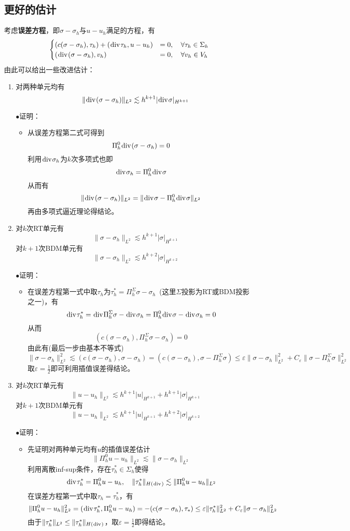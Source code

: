 \documentclass[a4paper,UTF8,fontset=windows]{ctexart}
\renewcommand*{\div}{\hspace{0.07em}\mathrm{div}\hspace{0.07em}}
\newcommand{\proo}[1]{{\kaishu $\bullet$证明：
\begin{itemize}
    \item[] #1
\end{itemize}
}}
\begin{document}
\subsection{更好的估计}
考虑\textbf{误差方程}，即$\sigma-\sigma_h$与$u-u_h$满足的方程，有
$$\begin{cases}(c(\sigma-\sigma_h),\tau_h)+(\div\tau_h,u-u_h)&=0,\quad\forall\tau_h\in\Sigma_h\\(\div(\sigma-\sigma_h),v_h)&=0,\quad\forall v_h\in V_h\end{cases}$$
由此可以给出一些改进估计：
\begin{enumerate}
    \item 对两种单元均有
    $$\|\div(\sigma-\sigma_h)\|_{L^2}\lesssim h^{k+1}|\div\sigma|_{H^{k+1}}$$
    
    \proo{
        从误差方程第二式可得到
        $$\Pi_h^0\div(\sigma-\sigma_h)=0$$
        利用$\div\sigma_h$为$k$次多项式也即
        $$\div\sigma_h=\Pi_h^0\div\sigma$$
        从而有
        $$\|\div(\sigma-\sigma_h)\|_{L^2}=\|\div\sigma-\Pi_h^0\div\sigma\|_{L^2}$$
        再由多项式逼近理论得结论。
    }
    
    \item
    对$k$次RT单元有
    $$\|\sigma-\sigma_h\|_{L^2}\lesssim h^{k+1}|\sigma|_{H^{k+1}}$$
    对$k+1$次BDM单元有
    $$\|\sigma-\sigma_h\|_{L^2}\lesssim h^{k+2}|\sigma|_{H^{k+2}}$$
    \proo{
        在误差方程第一式中取$\tau_h$为$\tau_h^*=\Pi_h^\Sigma\sigma-\sigma_h$\ (这里$\Sigma$投影为RT或BDM投影之一)，有
        $$\div\tau_h^*=\div\Pi_h^\Sigma\sigma-\div\sigma_h=\Pi_h^0\div\sigma-\div\sigma_h=0$$
        从而
        $$(c(\sigma-\sigma_h),\Pi_h^\Sigma\sigma-\sigma_h)=0$$
        由此有(最后一步由基本不等式)
        $$\|\sigma-\sigma_h\|_{L^2}^2\lesssim(c(\sigma-\sigma_h),\sigma-\sigma_h)=(c(\sigma-\sigma_h),\sigma-\Pi_h^\Sigma\sigma)\le\varepsilon\|\sigma-\sigma_h\|_{L^2}^2+C_\varepsilon\|\sigma-\Pi_h^\Sigma\sigma\|_{L^2}^2$$
        取$\varepsilon=\frac{1}{2}$即可利用插值误差得结论。
    }

    \item 
    对$k$次RT单元有
    $$\|u-u_h\|_{L^2}\lesssim h^{k+1}|u|_{H^{k+1}}+h^{k+1}|\sigma|_{H^{k+1}}$$
    对$k+1$次BDM单元有
    $$\|u-u_h\|_{L^2}\lesssim h^{k+1}|u|_{H^{k+1}}+h^{k+2}|\sigma|_{H^{k+2}}$$
    \proo{
        先证明对两种单元均有$u$的插值误差估计
        $$\|\Pi_h^0u-u_h\|_{L^2}\lesssim\|\sigma-\sigma_h\|_{L^2}$$
        利用离散inf-sup条件，存在$\tau_h^*\in\Sigma_h$使得
        $$\div\tau_h^*=\Pi_h^0u-u_h,\quad\|\tau_h^*\|_{H(\div)}\lesssim\|\Pi_h^0u-u_h\|_{L^2}$$
        在误差方程第一式中取$\tau_h=\tau_h^*$，有
        $$\|\Pi_h^0u-u_h\|_{L^2}^2=(\div\tau_h^*,\Pi_h^0u-u_h)=-(c(\sigma-\sigma_h),\tau_*)\le\varepsilon\|\tau_h^*\|_{L^2}^2+C_\varepsilon\|\sigma-\sigma_h\|_{L^2}^2$$
        由于$\|\tau_h^*\|_{L^2}\le\|\tau_h^*\|_{H(\div)}$，取$\varepsilon=\frac{1}{2}$即得结论。

}
\end{enumerate}
\end{document}
